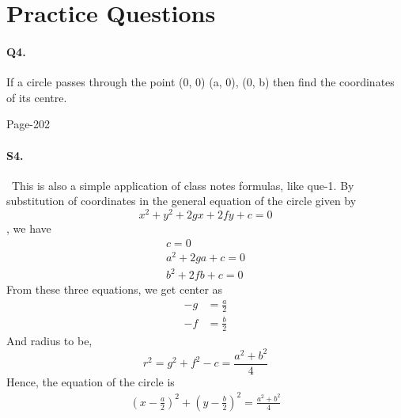 \documentclass{article}
\begin{document}
\clearpage
\section*{Practice Questions}
\paragraph{Q4.}If a circle passes through the point (0, 0) (a, 0), (0, b) then find the coordinates of
its centre.
\begin{flushright}
    Page-202
\end{flushright}
\paragraph{S4.}\
This is also a simple application of class notes formulas, like que-1.
By substitution of coordinates in the general equation of the  circle given by
$$x^2 + y^2 + 2gx + 2fy + c = 0$$, we have
\begin{align*}
    c = 0\\
    a^2 + 2ga + c = 0\\
    b^2 + 2fb + c = 0
\end{align*}
From these three equations, we get center as
\begin{align*}
    -g&=\frac{a}{2}\\
    -f&=\frac{b}{2}
\end{align*}
And radius to be,
\begin{equation*}
    r^2=g^2+f^2-c=\frac{a^2+b^2}{4}
\end{equation*}
Hence, the equation of the circle is
\begin{align*}
     \left(x - \frac{a}{2}\right)^2 + \left(y - \frac{b}{2}\right)^2 = \frac{a^2+b^2}{4}
\end{align*}
\clearpage
\end{document}
